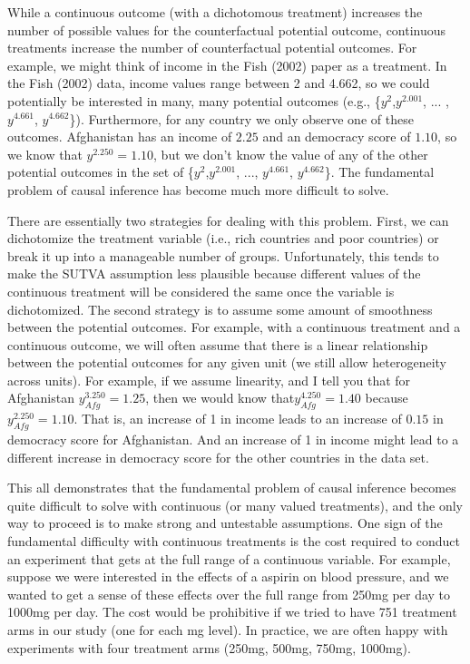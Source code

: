 \documentclass{article}
\begin{document}
While a continuous outcome (with a dichotomous treatment) increases the number of possible values for the counterfactual potential outcome, continuous treatments increase the number of counterfactual potential outcomes. For example, we might think of income in the Fish (2002) paper as a treatment. In the Fish (2002) data, income values range between 2 and 4.662, so we could potentially be interested in many, many potential outcomes (e.g., \{$y^2$,$y^{2.001}$, ... ,$y^{4.661}$, $y^{4.662}$\}). Furthermore, for any country we only observe one of these outcomes. Afghanistan has an income of $2.25$ and an democracy score of $1.10$, so we know that $y^{2.250}=1.10$, but we don't know the value of any of the other potential outcomes in the set of \{$y^2$,$y^{2.001}$, ..., $y^{4.661}$, $y^{4.662}$\}. The fundamental problem of causal inference has become much more difficult to solve. 

There are essentially two strategies for dealing with this problem. First, we can dichotomize the treatment variable (i.e., rich countries and poor countries) or break it up into a manageable number of groups. Unfortunately, this tends to make the SUTVA assumption less plausible because different values of the continuous treatment will be considered the same once the variable is dichotomized. The second strategy is to assume some amount of smoothness between the potential outcomes. For example, with a continuous treatment and a continuous outcome, we will often assume that there is a linear relationship between the potential outcomes for any given unit (we still allow heterogeneity across units). For example, if we assume linearity, and I tell you that for Afghanistan $y_{Afg}^{3.250}=1.25$, then we would know that$y_{Afg}^{4.250}=1.40$ because $y_{Afg}^{2.250}=1.10$. That is, an increase of 1 in income leads to an increase of $0.15$ in democracy score for Afghanistan. And an increase of 1 in income might lead to a different increase in democracy score for the other countries in the data set.  


This all demonstrates that the fundamental problem of causal inference becomes quite difficult to solve with continuous (or many valued treatments), and the only way to proceed is to make strong and untestable assumptions. One sign of the fundamental difficulty with continuous treatments is the cost required to conduct an experiment that gets at the full range of a continuous variable. For example, suppose we were interested in the effects of a aspirin on blood pressure, and we wanted to get a sense of these effects over the full range from 250mg per day to 1000mg per day. The cost would be prohibitive if we tried to have 751 treatment arms in our study (one for each mg level). In practice, we are often happy with experiments with four treatment arms (250mg, 500mg, 750mg, 1000mg). 
\end{document}

